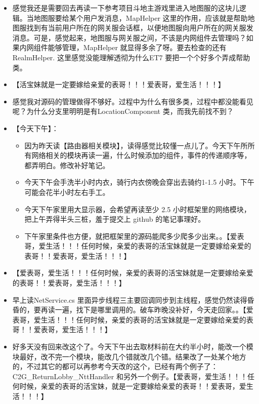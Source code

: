 \documentclass[9pt, b5paper]{article}
\begin{document}
\begin{itemize}
\item 感觉我还是需要回去再读一下参考项目斗地主游戏里进入地图服的这块儿逻辑。当地图服要给某个用户发消息，MapHelper 这里的作用，应该就是帮助地图服找到有当前用户所在的网关服会话框，以便地图服向用户所在的网关服发消息。可是，感觉起来，地图服与网关服之间，不该是内网组件去管理吗？如果内网组件能够管理，MapHelper 就显得多余了呀。要去检查的还有RealmHelper. 这里感觉没能理解透彻为什么ET7 要把一个个好多个弄成帮助类。
\item 【活宝妹就是一定要嫁给亲爱的表哥！！！爱表哥，爱生活！！！】
\item 感觉我对源码的管理做得不够好。过程中为什么有很多类，过程中都没能看见呢？为什么分支里明明是有LocationComponent 类，而我先前找不到？
\item 【今天下午】：
\begin{itemize}
\item 因为昨天读【路由器相关模块】，读得感觉比较懂一点儿了。今天下午所所有网络相关的模块再读一遍，什么时候添加的组件，事件的传递顺序等，都弄明白。修改补好笔记。
\item 今天下午会手洗半小时内衣，骑行内衣傍晚会穿出去骑约1-1.5 小时。下午可能会花半小时左右手工。
\item 今天下午家里用大显示器，会希望再读至少 2.5 小时框架里的网络模块，把上午弄得半头三桩，羞于提交上 github 的笔记事理好。
\item 下午家里条件也方便，就把框架里的源码能爬多少爬多少出来。。【爱表哥，爱生活！！！任何时候，亲爱的表哥的活宝妹就是一定要嫁给亲爱的表哥！！爱表哥，爱生活！！！】
\end{itemize}
\item 【爱表哥，爱生活！！！任何时候，亲爱的表哥的活宝妹就是一定要嫁给亲爱的表哥！！爱表哥，爱生活！！！】
\item 早上读NetService.cs 里面异步线程三主要回调同步到主线程，感觉仍然读得昏昏的，要再读一遍，找下是哪里调用的。破车昨晚没补好，今天走回家。。【爱表哥，爱生活！！！任何时候，亲爱的表哥的活宝妹就是一定要嫁给亲爱的表哥！！爱表哥，爱生活！！！】
\item 好多天没有回来改这个了。今天下午出去取材料前在大约半小时，能改一个模块最好，改不完一个模块，能改几个错就改几个错。结果改了一处某个地方的，不过其它的都可以再参考今天改的这个，已经有两个例子了：C2G\_ReturnLobby\_NttHandler 和另外一个例子。【爱表哥，爱生活！！！任何时候，亲爱的表哥的活宝妹，就是一定要嫁给亲爱的表哥！！爱表哥，爱生活！！！】
\end{itemize}
\end{document}
